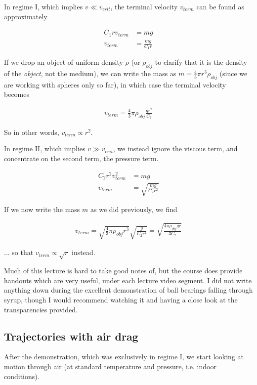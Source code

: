 \documentclass[12pt,a4paper]{report}
\begin{document}
In regime I, which implies $v \ll v_{crit}$, the terminal velocity $v_{term}$ can be found as approximately

\begin{align}
C_1 r v_{term} &= m g\\
v_{term} &= \frac{m g}{C_1 r}
\end{align}

If we drop an object of uniform density $\rho$ (or $\rho_{obj}$ to clarify that it is the density of the \emph{object}, not the medium), we can write the mass as $m = \frac{4}{3} \pi r^3 \rho_{obj}$ (since we are working with spheres only so far), in which case the terminal velocity becomes

\begin{align}
v_{term} = \frac{4}{3} \pi \rho_{obj} \frac{g r^2}{C_1}
\end{align}

So in other words, $v_{term} \propto r^2$.

In regime II, which implies $v \gg v_{crit}$, we instead ignore the viscous term, and concentrate on the second term, the pressure term.

\begin{align}
C_2 r^2 v_{term}^2 &= m g\\
v_{term} &= \sqrt{\frac{m g}{C_2 r^2}}
\end{align}

If we now write the mass $m$ as we did previously, we find

\begin{align}
v_{term} = \sqrt{\frac{4}{3} \pi \rho_{obj} r^3} \sqrt{\frac{ g}{C_2 r^2}} = \sqrt{\frac{4\pi \rho_{obj} g r}{3 C_2}}
\end{align}

... so that $v_{term} \propto \sqrt{r}$ instead.

Much of this lecture is hard to take good notes of, but the course does provide handouts which are very useful, under each lecture video segment. I did not write anything down during the excellent demonstration of ball bearings falling through syrup, though I would recommend watching it and having a close look at the transparencies provided.

\subsection{Trajectories with air drag}

After the demonstration, which was exclusively in regime I, we start looking at motion through air (at standard temperature and pressure, i.e. indoor conditions).
\end{document}
